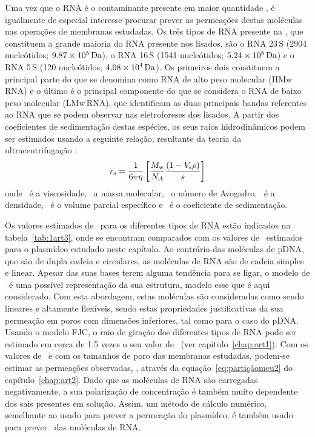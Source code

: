 Uma vez que o RNA é o contaminante presente em maior quantidade \cite{duvaltff,freitas09}, é igualmente de especial interesse procurar prever as permeações destas moléculas nas operações de membranas estudadas. Os três tipos de RNA presente na \ecoli, que constituem a grande maioria do RNA presente nos lisados, são o RNA 23\,S (2904 nucleótidos; $9.87\times 10^{5}\,\mathrm{Da}$), o RNA 16\,S (1541 nucleótidos; $5.24\times 10^{5}\,\mathrm{Da}$) e o RNA 5\,S (120 nucleótidos; $4.08\times 10^{4}\,\mathrm{Da}$).
%
%
%
Os primeiros dois constituem a principal parte do que se denomina como RNA de alto peso molecular (HMw\,RNA) e o último é o principal componente do que se considera o RNA de baixo peso molecular (LMw\,RNA), que identificam as duas principais bandas referentes ao RNA que se podem observar nas eletroforeses dos lisados.
%
%
A partir dos coeficientes de sedimentação destas espécies, os seus raios hidrodinâmicos podem ser estimados usando a seguinte relação, resultante da teoria da ultracentrifugação \cite{voet}:
%
%
%
\begin{equation}
\label{eq:1art3}
r_{\mathrm{s}}=\frac{1}{6\pi\eta}\left[ \frac{M_\mathrm{w}}{N_{A}}\frac{(1-V_{\mathrm{s}}\rho)}{s}\right]
\end{equation}
onde \viscosidade\ é a viscosidade, \massamolecular\ a massa molecular, \avogadro\ o número de Avogadro, \densidade\ é a densidade, \volumeparcial\ é o volume parcial específico e \sedimentacao\ é o coeficiente de sedimentação.
% 

Os valores estimados de \raiostokes\ para os diferentes tipos de RNA estão indicados na tabela~\ref{tab:1art3}, onde se encontram comparados com os valores de \raiostokes\ estimados para o plasmídeo estudado neste capítulo. Ao contrário das moléculas de pDNA, que são de dupla cadeia e circulares, as moléculas de RNA são de cadeia simples e linear. Apesar das suas bases terem alguma tendência para se ligar, o modelo de \fjc\ é uma possível representação da sua estrutura, modelo esse que é aqui considerado. Com esta abordagem, estas moléculas são consideradas como sendo lineares e altamente flexíveis, sendo estas propriedades justificativas da sua permeação em poros com dimensões inferiores, tal como para o caso do pDNA. Usando o modelo FJC, o raio de giração dos diferentes tipos de RNA pode ser estimado em cerca de 1.5 vezes o seu valor de \raiostokes\ (ver capítulo~\ref{chap:art1}).
%
Com os valores de \raiogiracao\ e com os tamanhos de poro das membranas estudadas, podem-se estimar as permeações observadas, \permobs, através da equação~\ref{eq:partiçãomeu2} do capítulo~\ref{chap:art2}. Dado que as moléculas de RNA são carregadas negativamente, a sua polarização de concentração é também muito dependente dos sais presentes em solução. Assim, um método de cálculo numérico, semelhante ao usado para prever a permeação do plasmídeo, é também usado para prever \permobs\ das moléculas de RNA.

